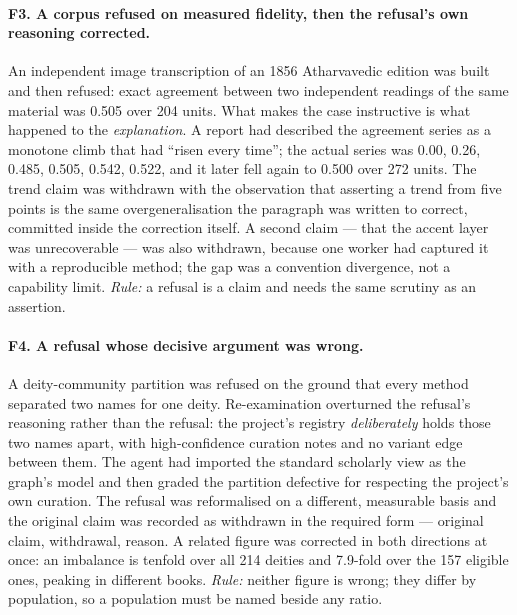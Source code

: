 \paragraph{F3. A corpus refused on measured fidelity, then the refusal's own
reasoning corrected.} An independent image transcription of an 1856 Atharvavedic
edition was built and then refused: exact agreement between two independent readings
of the same material was 0.505 over 204 units. What makes the case instructive is
what happened to the \emph{explanation}. A report had described the agreement series
as a monotone climb that had ``risen every time''; the actual series was 0.00, 0.26,
0.485, 0.505, 0.542, 0.522, and it later fell again to 0.500 over 272 units. The
trend claim was withdrawn with the observation that asserting a trend from five
points is the same overgeneralisation the paragraph was written to correct, committed
inside the correction itself. A second claim --- that the accent layer was
unrecoverable --- was also withdrawn, because one worker had captured it with a
reproducible method; the gap was a convention divergence, not a capability limit.
\emph{Rule:} a refusal is a claim and needs the same scrutiny as an assertion.

\paragraph{F4. A refusal whose decisive argument was wrong.} A deity-community
partition was refused on the ground that every method separated two names for one
deity. Re-examination overturned the refusal's reasoning rather than the refusal: the
project's registry \emph{deliberately} holds those two names apart, with
high-confidence curation notes and no variant edge between them. The agent had
imported the standard scholarly view as the graph's model and then graded the
partition defective for respecting the project's own curation. The refusal was
reformalised on a different, measurable basis and the original claim was recorded as
withdrawn in the required form --- original claim, withdrawal, reason. A related
figure was corrected in both directions at once: an imbalance is tenfold over all 214
deities and 7.9-fold over the 157 eligible ones, peaking in different books.
\emph{Rule:} neither figure is wrong; they differ by population, so a population must
be named beside any ratio.


